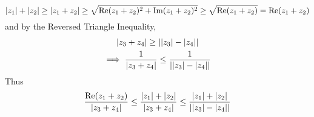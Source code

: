\documentclass[11pt, oneside]{book}
\begin{document}
\begin{enumerate}
\begin{equation*}
		\left|z_1\right| + \left|z_2\right| \geq \left|z_1 + z_2\right| \geq \sqrt{\operatorname{Re}(z_1 + z_2)^2 + \operatorname{Im}(z_1 + z_2)^2} \geq \sqrt{\operatorname{Re}(z_1 + z_2)} = \operatorname{Re}(z_1 + z_2)
	\end{equation*}
	and by the Reversed Triangle Inequality,
	\begin{gather*}
		\left|z_3 + z_4\right| \geq \left|\left|z_3\right| - \left|z_4\right|\right| \\
		\implies \frac{1}{\left|z_3 + z_4\right|} \leq \frac{1}{\left|\left|z_3\right| - \left|z_4\right|\right|} 
	\end{gather*}
	Thus
	\begin{equation*}
		\frac{\operatorname{Re}(z_1 + z_2)}{\left|z_3 + z_4\right|} \leq \frac{\left|z_1\right| + \left|z_2\right|}{\left|z_3 + z_4\right|} \leq \frac{\left|z_1\right| + \left|z_2\right|}{\left|\left|z_3\right| - \left|z_4\right|\right|}
	\end{equation*}
\end{enumerate}



\end{document}
